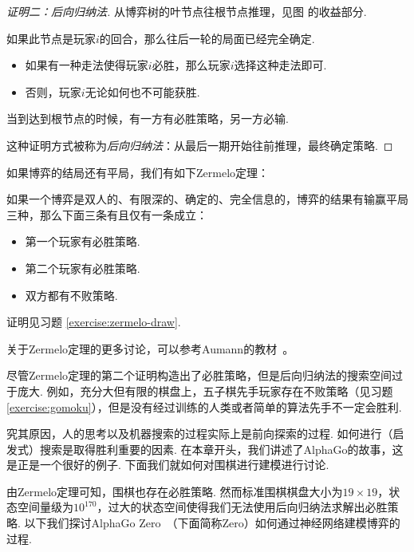 \begin{proof}[证明二：后向归纳法]
从博弈树的叶节点往根节点推理，见图 的收益部分. 

如果此节点是玩家$i$的回合，那么往后一轮的局面已经完全确定.
\begin{itemize}
    \item 如果有一种走法使得玩家$i$必胜，那么玩家$i$选择这种走法即可.
    \item 否则，玩家$i$无论如何也不可能获胜.
\end{itemize}

当到达到根节点的时候，有一方有必胜策略，另一方必输.

这种证明方式被称为\textit{后向归纳法}：从最后一期开始往前推理，最终确定策略.
\end{proof}

如果博弈的结局还有平局，我们有如下Zermelo定理：
\begin{theorem}[有平局的Zermelo定理]\label{thm:zermelo-draw}
如果一个博弈是双人的、有限深的、确定的、完全信息的，博弈的结果有输赢平局三种，那么下面三条有且仅有一条成立：
\begin{itemize}
    \item 第一个玩家有必胜策略.
    \item 第二个玩家有必胜策略.
    \item 双方都有不败策略.
\end{itemize}
\end{theorem}
证明见习题 \ref{exercise:zermelo-draw}.

\begin{remark}
    关于Zermelo定理的更多讨论，可以参考Aumann的教材~\cite{aumannLecturesGameTheory1989}。
\end{remark}

尽管Zermelo定理的第二个证明构造出了必胜策略，但是后向归纳法的搜索空间过于庞大. 例如，充分大但有限的棋盘上，五子棋先手玩家存在不败策略（见习题 \ref{exercise:gomoku}），但是没有经过训练的人类或者简单的算法先手不一定会胜利. 

究其原因，人的思考以及机器搜索的过程实际上是前向探索的过程. 如何进行（启发式）搜索是取得胜利重要的因素. 在本章开头，我们讲述了AlphaGo的故事，这是正是一个很好的例子. 下面我们就如何对围棋进行建模进行讨论.

由Zermelo定理可知，围棋也存在必胜策略. 然而标准围棋棋盘大小为$19\times 19$，状态空间量级为$10^{170}$，过大的状态空间使得我们无法使用后向归纳法求解出必胜策略. 以下我们探讨AlphaGo Zero~\cite{silverMasteringGameGo2017}（下面简称Zero）如何通过神经网络建模博弈的过程.

